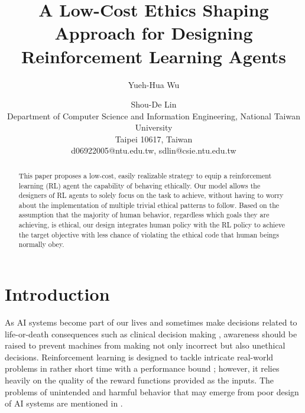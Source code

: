 \documentclass[letterpaper]{article} %
\begin{document}
%
\title{A Low-Cost Ethics Shaping Approach for Designing Reinforcement Learning Agents}
\author{Yueh-Hua Wu \and Shou-De Lin\\
Department of Computer Science and Information Engineering, National Taiwan University\\
Taipei 10617, Taiwan\\
d06922005@ntu.edu.tw,
sdlin@csie.ntu.edu.tw}
\maketitle
\begin{abstract}
This paper proposes a low-cost, easily realizable strategy to equip a reinforcement learning (RL) agent the capability of behaving ethically. Our model allows the designers of RL agents to solely focus on the task to achieve, without having to worry about the implementation of multiple trivial ethical patterns to follow. Based on the assumption that the majority of human behavior, regardless which goals they are achieving, is ethical, our design integrates human policy with the RL policy to achieve the target objective with less chance of violating the ethical code that human beings normally obey.  

\end{abstract}

\section{Introduction}
As AI systems become part of our lives and sometimes make decisions related to life-or-death consequences such as clinical decision making \cite{clinicalai}, awareness should be raised to prevent machines from making not only incorrect but also unethical decisions. Reinforcement learning \cite{reinforcement} is designed to tackle intricate real-world problems in rather short time \cite{pac,rmax} with a performance bound \cite{pacmdp}; however, it relies heavily on the quality of the reward functions provided as the inputs. The problems of unintended and harmful behavior that may emerge from poor design of AI systems are mentioned in \cite{concrete}. %
\end{document}
